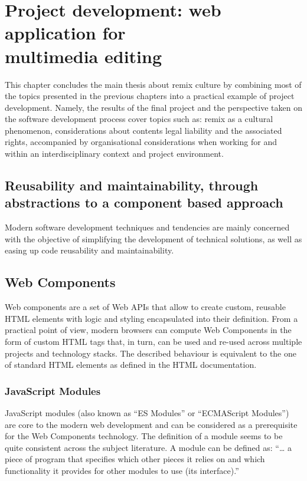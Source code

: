 \chapter{Project development: web application for \\ multimedia editing}
\label{ch:ch3_ProjectDevelopment}


This chapter concludes  the main thesis about remix culture by combining most of the topics presented in the previous chapters into a practical example of project development. Namely, the results of the final project and the perspective taken on the software development process cover  topics such as: remix as a cultural phenomenon, considerations about contents legal liability and the associated rights, accompanied  by organisational considerations when working for and within an interdisciplinary context and project environment.

\section{Reusability and maintainability, through abstractions to a component based approach}

Modern software development techniques and tendencies are mainly concerned with the objective of simplifying the development of technical solutions, as well as easing up code reusability and maintainability.

\section{Web Components}

Web components are a set of Web APIs that allow to create custom, reusable HTML elements with logic and styling encapsulated into their definition. From a practical point of view, modern browsers can compute Web Components in the form of custom HTML tags that, in turn, can be used and re-used across multiple projects and technology stacks. The described behaviour is equivalent to the one of standard HTML elements as defined in the HTML documentation.

\subsection{JavaScript Modules}

JavaScript modules (also known as “ES Modules” or “ECMAScript Modules”) are core to the modern web development and can be considered as a prerequisite for the Web Components technology. The definition of a module seems to be quite consistent across the subject literature. A module can be defined as: “… a piece of program that specifies which other pieces it relies on and which functionality it provides for other modules to use (its interface).”

